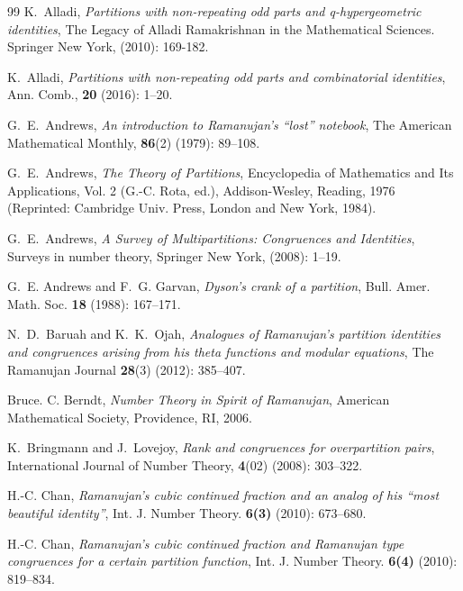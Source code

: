 \documentclass[12pt]{amsart}
\numberwithin{equation}{section}
\theoremstyle{plain}
\theoremstyle{definition}
\begin{document}
\begin{thebibliography}{99}
K.~Alladi, \emph{Partitions with non-repeating odd parts and q-hypergeometric identities}, The Legacy of Alladi Ramakrishnan in the Mathematical Sciences. Springer New York, (2010): 169-182.

K.~Alladi, \emph{Partitions with non-repeating odd parts and combinatorial identities}, Ann. Comb., \textbf{20} (2016): 1--20.

G.~E.~Andrews, \emph{An introduction to Ramanujan's ``lost'' notebook}, The American Mathematical Monthly, {\bf 86}(2) (1979): 89--108.

G.~E.~Andrews, \emph{The Theory of Partitions}, Encyclopedia of Mathematics and Its Applications, Vol. 2 (G.-C. Rota, ed.), Addison-Wesley, Reading, 1976 (Reprinted: Cambridge Univ. Press, London and New York, 1984).

G.~E.~Andrews, \emph{A Survey of Multipartitions: Congruences and Identities}, Surveys in number theory, Springer New York, (2008): 1--19.


G.~E. Andrews and F.~G. Garvan, \emph{Dyson's crank of a partition}, Bull. Amer. Math. Soc. {\bf 18} (1988): 167--171.

N.~D.~Baruah and K.~K.~Ojah, \emph{Analogues of Ramanujan's partition identities and congruences arising from his theta functions and modular equations}, The Ramanujan Journal {\bf 28}(3) (2012): 385--407.


Bruce. C. Berndt, \emph{Number Theory in Spirit of Ramanujan}, American Mathematical Society, Providence, RI, 2006.

K.~Bringmann and J.~Lovejoy, \emph{Rank and congruences for overpartition pairs}, International Journal of Number Theory, {\bf 4}(02) (2008): 303--322.

H.-C. Chan, \emph{Ramanujan's cubic continued fraction and an analog of his ``most beautiful identity''}, Int. J. Number Theory. \textbf{6(3)} (2010): 673--680.

H.-C. Chan, \emph{Ramanujan's cubic continued fraction and Ramanujan type congruences for a certain partition function}, Int. J. Number Theory. \textbf{6(4)} (2010): 819--834.


\end{thebibliography}
\end{document}
